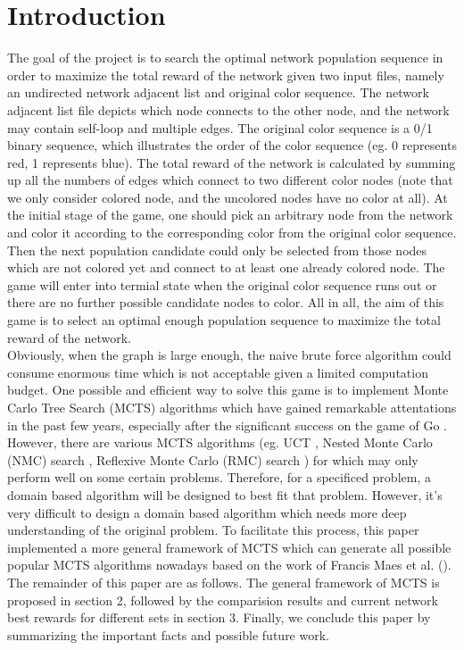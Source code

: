 \documentclass{article}
\begin{document}
\section{Introduction}
The goal of the project is to search the optimal network population sequence in order to maximize the total reward of the network given two input files, namely an undirected network adjacent list and original color sequence. The network adjacent list file depicts which node connects to the other node, and the network may contain self-loop and multiple edges. The original color sequence is a 0/1 binary sequence, which illustrates the order of the color sequence (eg. 0 represents red, 1 represents blue). The total reward of the network is calculated by summing up all the numbers of edges which connect to two different color nodes (note that we only consider colored node, and the uncolored nodes have no color at all). At the initial stage of the game, one should pick an arbitrary node from the network and color it according to the corresponding color from the original color sequence. Then the next population candidate could only be selected from those nodes which are not colored yet and connect to at least one already colored node. The game will enter into termial state when the original color sequence runs out or there are no further possible candidate nodes to color. All in all, the aim of this game is to select an optimal enough population sequence to maximize the total reward of the network.\\

Obviously, when the graph is large enough, the naive brute force algorithm could consume enormous time which is not acceptable given a limited computation budget. One possible and efficient way to solve this game is to implement Monte Carlo Tree Search (MCTS) algorithms which have gained remarkable attentations in the past few years, especially after the significant success on the game of Go \cite{coulom2007efficient}. However, there are various MCTS algorithms (eg. UCT \cite{kocsis2006bandit}, Nested Monte Carlo (NMC) search \cite{cazenave2009nested}, Reflexive Monte Carlo (RMC) search \cite{cazenave2007reflexive}) for which may only perform well on some certain problems. Therefore, for a specificed problem, a domain based algorithm will be designed to best fit that problem. However, it's very difficult to design a domain based algorithm which needs more deep understanding of the original problem. To facilitate this process, this paper implemented a more general framework of MCTS which can generate all possible popular MCTS algorithms nowadays based on the work of Francis Maes et al. (\cite{maes2012monte}). The remainder of this paper are as follows. The general framework of MCTS is proposed in section 2, followed by the comparision results and current network best rewards for different sets in section 3. Finally, we conclude this paper by summarizing the important facts and possible future work.
\end{document}
